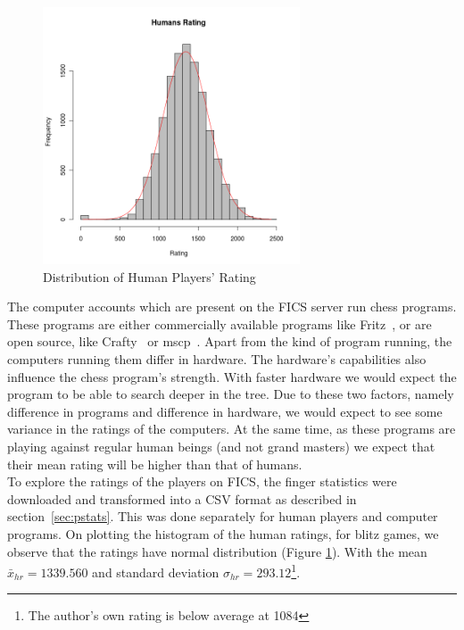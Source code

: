 \documentclass{article}
\begin{document}
\begin{figure} [htp]
\begin{center}
\includegraphics[width=3in]{humans_rating.png}
\end{center}
\caption{Distribution of Human Players' Rating}
\label{fig:humanrating}
\end{figure}

The computer accounts which are present on the FICS server run chess programs. These programs are either commercially available programs like Fritz~\cite{web:fritz}, or are open source, like Crafty~\cite{web:crafty} or mscp~\cite{web:mscp}. Apart from the kind of program running, the computers running them differ in hardware. The hardware's capabilities also influence the chess program's strength. With faster hardware we would expect the program to be able to search deeper in the tree. Due to these two factors, namely difference in programs and difference in hardware, we would expect to see some variance in the ratings of the computers. At the same time, as these programs are playing against regular human beings (and not grand masters) we expect that their mean rating will be higher than that of humans. \\



To explore the ratings of the players on FICS, the finger statistics were downloaded and transformed into a CSV format as described in section~\ref{sec:pstats}. This was done separately for human players and computer programs. On plotting the histogram of the human ratings, for blitz games, we observe that the ratings have normal distribution (Figure \ref{fig:humanrating}). With the mean $\bar{x}_{hr} = 1339.560$ and standard deviation $\sigma_{hr} = 293.12$\footnote{The author's own rating is below average at 1084}.\\
\end{document}
